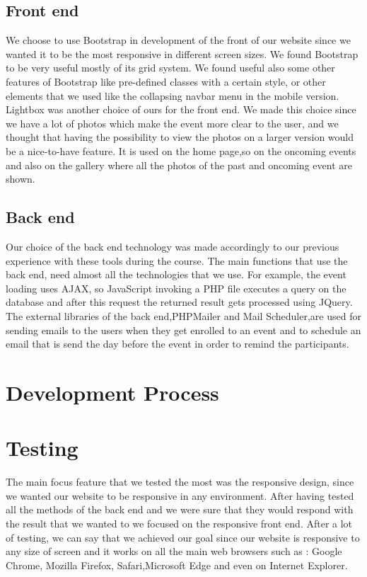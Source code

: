 \documentclass[a4paper]{article}
\begin{document}
	\subsection{Front end}
	We choose to use Bootstrap in development of the front of our website since we wanted it to be the most responsive in different screen sizes. We found Bootstrap to be very useful mostly of its grid system. We found useful also some other features of Bootstrap like pre-defined classes with a certain style, or other elements that we used like the collapsing navbar menu in the mobile version.\\
	Lightbox was another choice of ours for the front end. We made this choice since we have a lot of photos which make the event more clear to the user, and we thought that having the possibility to view the photos on a larger version would be a nice-to-have feature. It is used on the home page,so on the oncoming events and also on the gallery where all the photos of the past and oncoming event are shown.\\
	\subsection{Back end}
	Our choice of the back end technology was made accordingly to our previous experience with these tools during the course. The main functions that use the back end, need almost all the technologies that we use. For example, the event loading uses AJAX, so JavaScript invoking a PHP file executes a query on the database and after this request the returned result gets processed using JQuery. \\ 
	The external libraries of the back end,PHPMailer and Mail Scheduler,are used for sending emails to the users when they get enrolled to an event and to schedule an email that is send the day before the event in order to remind the participants.\\

	\section{Development Process}

	\section{Testing}
	The main focus feature that we tested the most was the responsive design, since we wanted our website to be responsive in any environment. After having tested all the methods of the back end and we were sure that they would respond with the result that we wanted to we focused on the responsive front end. After a lot of testing, we can say that we achieved our goal since our website is responsive to any size of screen and it works on  all the main web browsers such as : Google Chrome, Mozilla Firefox, Safari,Microsoft Edge and even on Internet Explorer.
	
\end{document}
